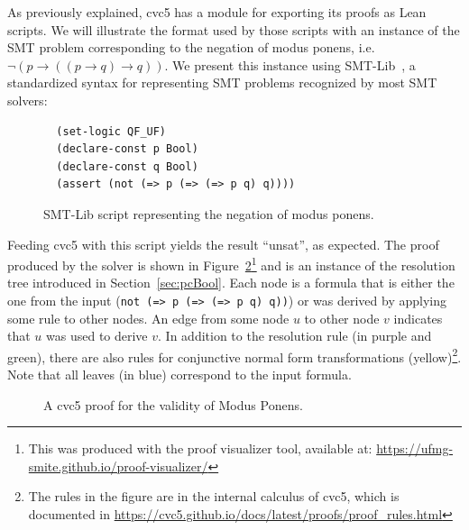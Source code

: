 As previously explained, cvc5 has a module for exporting its proofs as Lean scripts.
We will illustrate the format used by those scripts with an instance of the SMT problem corresponding
to the negation of modus ponens, i.e. $\neg (p \rightarrow ((p \rightarrow q) \rightarrow q))$.
We present this instance using SMT-Lib~\cite{smtlib}, a standardized syntax for
representing SMT problems recognized by most SMT solvers:

\begin{figure}[h]
\begin{verbatim}
  (set-logic QF_UF)
  (declare-const p Bool)
  (declare-const q Bool)
  (assert (not (=> p (=> (=> p q) q))))
\end{verbatim}
\caption{SMT-Lib script representing the negation of modus ponens.}\label{negModusPonens}
\end{figure}
Feeding cvc5 with this script yields the result ``unsat'', as expected. The proof produced by the solver is shown in Figure~\ref{fig:cvc5-proof}\footnote{This was produced with the proof visualizer tool, available at: \url{https://ufmg-smite.github.io/proof-visualizer/}} and is an instance of the resolution tree introduced in Section~\ref{sec:pcBool}.
Each node is a formula that is either the one from the input (\texttt{not (=> p (=> (=> p q) q))}) or was derived by applying some
rule to other nodes. An edge from some node $u$ to other node $v$ indicates that
$u$ was used to derive $v$.
In addition to the resolution rule (in purple and green), there are also rules for conjunctive normal form transformations (yellow)\footnote{The rules in the figure are in the internal calculus of cvc5, which is documented in \url{https://cvc5.github.io/docs/latest/proofs/proof_rules.html}}. Note that all leaves (in blue) correspond to the input formula.

\makeatletter
\setlength{\@fptop}{0pt}
\makeatother

\begin{figure}[t!]
  \centering
  \caption{A cvc5 proof for the validity of Modus Ponens.}
  \label{fig:cvc5-proof}
\end{figure}

